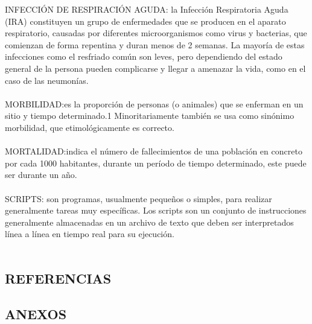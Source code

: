 \documentclass[a4paper,openright,12pt]{book}
\theoremstyle{definition}
\theoremstyle{remark}
\begin{document}
INFECCIÓN DE RESPIRACIÓN AGUDA: la Infección Respiratoria Aguda (IRA) constituyen un grupo de enfermedades que se producen en el aparato respiratorio, causadas por diferentes microorganismos como virus y bacterias, que comienzan de forma repentina y duran menos de 2 semanas.
La mayoría de estas infecciones como el resfriado común son leves, pero dependiendo del estado general de la persona pueden complicarse y llegar a amenazar la vida, como en el caso de las neumonías. \\\\
MORBILIDAD:es la proporción de personas (o animales) que se enferman en un sitio y tiempo determinado.1 Minoritariamente también se usa como sinónimo morbilidad, que etimológicamente es correcto.  \\\\
MORTALIDAD:indica el número de fallecimientos de una población en concreto por cada 1000 habitantes, durante un período de tiempo determinado, este puede ser durante un año. \\\\
SCRIPTS: son programas, usualmente pequeños o simples, para realizar generalmente tareas muy específicas. Los scripts son un conjunto de instrucciones generalmente almacenadas en un archivo de texto que deben ser interpretados línea a línea en tiempo real para su ejecución.\\\\
\clearpage

\begin{center}
 \chapter{REFERENCIAS}\label{cap.referencias}
\end{center}

\begin{center}
 \chapter{ANEXOS}\label{cap.anexos}
\end{center}
\end{document}
